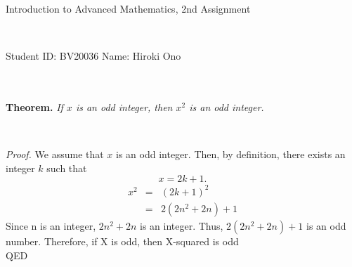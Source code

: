 \documentclass[12pt]{amsart}
\begin{document}
\begin{center}
    Introduction to Advanced Mathematics, 2nd Assignment
\end{center}

\

\begin{flushright}
\rm
Student ID: {BV20036} \quad \quad
Name: {Hiroki Ono}
\end{flushright}
\ \\ \ \\

\noindent
{\bf Theorem.} {\it If $x$ is an odd integer, then $x^2$ is an odd integer.}

\

\noindent
{\it Proof.}  We assume that $x$ is an odd integer. Then, by definition, there exists an integer $k$ such that
\[
x=2k+1.
\]
\begin{eqnarray*}
    x^2 &=& (2k+1)^2 \\
      &=& 2(2n^2+2n)+1
    \end{eqnarray*}
    Since n is an integer, $2n^2+2n$ is an integer. Thus, $2(2n^2+2n)+1$ is an odd number.
    Therefore, if X is odd, then X-squared is odd\\
\hfill QED
\end{document}
